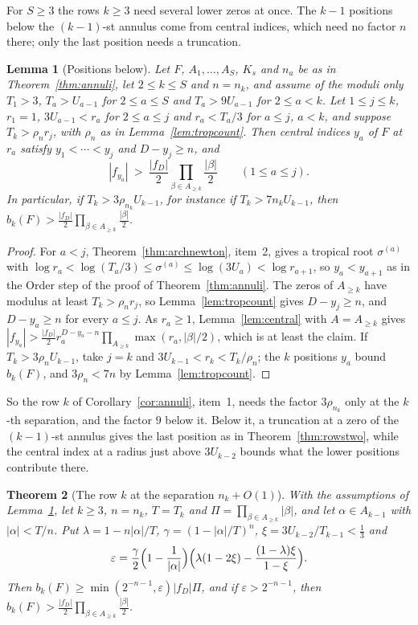 \documentclass[11pt]{article}
\newtheorem{theorem}{Theorem}[section]
\newtheorem{lemma}[theorem]{Lemma}
\begin{document}
For $S\ge3$ the rows $k\ge3$ need several lower zeros at once.  The $k-1$
positions below the $(k-1)$-st annulus come from central indices, which need
no factor $n$ there; only the last position needs a truncation.

\begin{lemma}[Positions below]\label{lem:rowsbelow}
Let $F$, $A_1,\ldots,A_S$, $K_s$ and $n_a$ be as in
Theorem~\ref{thm:annuli}, let $2\le k\le S$ and $n=n_k$, and assume of the
moduli only $T_1>3$, $T_a>U_{a-1}$ for $2\le a\le S$ and $T_a>9U_{a-1}$ for
$2\le a<k$.  Let $1\le j\le k$, $r_1=1$, $3U_{a-1}<r_a$ for $2\le a\le j$
and $r_a<T_a/3$ for $a\le j$, $a<k$, and suppose $T_k>\rho_nr_j$, with
$\rho_n$ as in Lemma~\ref{lem:tropcount}.  Then central indices $y_a$ of $F$ at $r_a$ satisfy
$y_1<\cdots<y_j$ and $D-y_j\ge n$, and
\[
  |f_{y_a}|\ >\ \frac{|f_D|}2\prod_{\beta\in A_{\ge k}}\frac{|\beta|}2\qquad(1\le a\le j).
\]
In particular, if $T_k>3\rho_{n_k}U_{k-1}$, for instance if
$T_k>7n_kU_{k-1}$, then
$b_k(F)>\frac{|f_D|}2\prod_{\beta\in A_{\ge k}}\frac{|\beta|}2$.
\end{lemma}

\begin{proof}
For $a<j$, Theorem~\ref{thm:archnewton}, item~2, gives a tropical root
$\sigma^{(a)}$ with $\log r_a<\log(T_a/3)\le\sigma^{(a)}\le\log(3U_a)<\log
r_{a+1}$, so $y_a<y_{a+1}$ as in the Order step of the proof of
Theorem~\ref{thm:annuli}.  The zeros of $A_{\ge k}$ have modulus at least
$T_k>\rho_nr_j$, so Lemma~\ref{lem:tropcount} gives $D-y_j\ge n$, and
$D-y_a\ge n$ for every $a\le j$.  As $r_a\ge1$, Lemma~\ref{lem:central} with
$A=A_{\ge k}$ gives
$|f_{y_a}|>\frac{|f_D|}2r_a^{D-y_a-n}\prod_{A_{\ge k}}\max(r_a,|\beta|/2)$,
which is at least the claim.  If $T_k>3\rho_nU_{k-1}$, take $j=k$ and
$3U_{k-1}<r_k<T_k/\rho_n$; the $k$ positions $y_a$ bound $b_k(F)$, and
$3\rho_n<7n$ by Lemma~\ref{lem:tropcount}.
\end{proof}

So the row $k$ of Corollary~\ref{cor:annuli}, item~1, needs the factor
$3\rho_{n_k}$ only at the $k$-th separation, and the factor $9$ below it.  Below it, a truncation at a zero of the
$(k-1)$-st annulus gives the last position as in Theorem~\ref{thm:rowstwo},
while the central index at a radius just above $3U_{k-2}$ bounds what the
lower positions contribute there.

\begin{theorem}[The row $k$ at the separation $n_k+O(1)$]\label{thm:rowsk}
With the assumptions of Lemma~\ref{lem:rowsbelow}, let $k\ge3$, $n=n_k$,
$T=T_k$ and $\Pi=\prod_{\beta\in A_{\ge k}}|\beta|$, and let $\alpha\in
A_{k-1}$ with $|\alpha|<T/n$.  Put $\lambda=1-n|\alpha|/T$,
$\gamma=(1-|\alpha|/T)^n$, $\xi=3U_{k-2}/T_{k-1}<\frac13$ and
\[
  \varepsilon=\frac\gamma2\Bigl(1-\frac1{|\alpha|}\Bigr)
  \Bigl(\lambda(1-2\xi)-\frac{(1-\lambda)\xi}{1-\xi}\Bigr).
\]
Then $b_k(F)\ge\min(2^{-n-1},\varepsilon)|f_D|\Pi$, and if
$\varepsilon>2^{-n-1}$, then $b_k(F)>\frac{|f_D|}2\prod_{\beta\in A_{\ge k}}\frac{|\beta|}2$.
\end{theorem}
\end{document}
